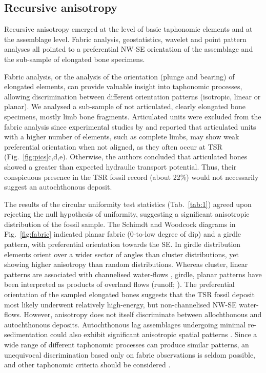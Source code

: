 \documentclass[5p,times,authoryear]{elsarticle}
\begin{document}
\subsection{Recursive anisotropy}

Recursive anisotropy emerged at the level of basic taphonomic elements and at the assemblage level. Fabric analysis, geostatistics, wavelet and point pattern analyses all pointed to a preferential NW-SE orientation of the assemblage and the sub-sample of elongated bone specimens.

Fabric analysis, or the analysis of the orientation (plunge and bearing) of elongated elements, can provide valuable insight into taphonomic processes, allowing discrimination between different orientation patterns (isotropic, linear or planar). We analysed a sub-sample of not articulated, clearly elongated bone specimens, mostly limb bone fragments. Articulated units were excluded from the fabric analysis since experimental studies by \cite{Coard1995} and \cite{Coard1999} reported that articulated units with a higher number of elements, such as complete limbs, may show weak preferential orientation when not aligned, as they often occur at TSR (Fig.~\ref{fig:pics}c,d,e). Otherwise, the authors concluded that articulated bones showed a greater than expected hydraulic transport potential. Thus, their conspicuous presence in the TSR fossil record (about 22\%) would not necessarily suggest an autochthonous deposit.

The results of the circular uniformity test statistics (Tab.~\ref{tab:1}) agreed upon rejecting the null hypothesis of uniformity, suggesting a significant anisotropic distribution of the fossil sample. The Schimdt and Woodcock diagrams in Fig.~\ref{fig:fabric} indicated planar fabric (0-to-low degree of dip) and a girdle pattern, with preferential orientation towards the SE. In girdle distribution elements orient over a wider sector of angles than cluster distributions, yet showing higher anisotropy than random distributions. Whereas cluster, linear patterns are associated with channelised water-flows \citep{Petraglia1994}, girdle, planar patterns have been interpreted as products of overland flows (runoff; \citealp{Organista2017}). The preferential orientation of the sampled elongated bones suggests that the TSR fossil deposit most likely underwent relatively high-energy, but non-channelised NW-SE water-flows. However, anisotropy does not itself discriminate between allochthonous and autochthonous deposits. Autochthonous lag assemblages undergoing minimal re-sedimentation could also exhibit significant anisotropic spatial patterns \citep{Dominguez-Rodrigo2012,Dominguez-Rodrigo2014a,Dominguez-Rodrigo2014b,Dominguez-Rodrigo2017}. Since a wide range of different taphonomic processes can produce similar patterns, an unequivocal discrimination based only on fabric observations is seldom possible, and other taphonomic criteria should be considered \citep{Lenoble2004}.
\end{document}
